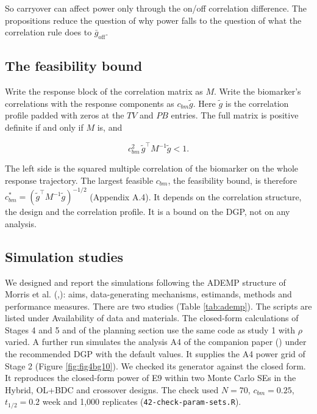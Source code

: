 \documentclass[
  11pt,
]{article}
\begin{document}
So carryover can affect power only through the on/off correlation
difference. The propositions reduce the question of why power falls
to the question of what the correlation rule does to
\(\bar g_{\text{off}}\).

\subsection{The feasibility bound}\label{the-feasibility-bound}

Write the response block of the correlation matrix as \(M\). Write the
biomarker's correlations with the response components as
\(c_{bm}\tilde g\). Here \(\tilde g\) is the correlation profile padded
with zeros at the \(TV\) and \(PB\) entries. The full matrix is positive
definite if and only if \(M\) is, and

\[c_{bm}^2\, \tilde g^\top M^{-1} \tilde g < 1 .\]

The left side is the squared multiple correlation of the biomarker on
the whole response trajectory. The largest feasible \(c_{bm}\), the
feasibility bound, is therefore
\(c_{bm}^{\ast} = (\tilde g^\top M^{-1} \tilde g)^{-1/2}\) (Appendix A.4).
It depends on the correlation structure, the design and the
correlation profile. It is a bound on the DGP, not on any analysis.

\subsection{Simulation studies}\label{simulation-studies}

We designed and report the simulations following the ADEMP structure
of Morris et al. (,): aims,
data-generating mechanisms, estimands, methods and performance
measures. There are
two studies (Table \ref{tab:ademp}). The scripts are listed under
Availability of data and materials. The closed-form calculations of
Stages 4 and 5 and of the planning section use the same code as study
1 with \(\rho\) varied. A further run simulates the analysis A4 of the
companion paper () under the recommended DGP with
the default values. It supplies the A4 power grid of Stage 2 (Figure
\ref{fig:fig4bg10}). We checked its generator against the closed
form. It reproduces the closed-form power of E9 within two Monte Carlo
SEs in the Hybrid, OL+BDC and crossover designs. The check used
\(N = 70\), \(c_{bm} = 0.25\), \(t_{1/2} = 0.2\) week and 1,000 replicates
(\texttt{42-check-param-sets.R}).
\end{document}
